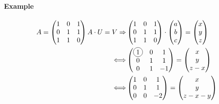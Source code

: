 \documentclass[notitlepage]{math}
\begin{document}
\paragraph{Example}
\begin{align*}
        A = \begin{pmatrix}
        1 & 0 & 1 \\
        0 & 1 & 1 \\
        1 & 1 & 0 
        \end{pmatrix} 
        A \cdot U = V \Rightarrow& 
        \begin{pmatrix}
            1 & 0 & 1 \\
            0 & 1 & 1 \\
            1 & 1 & 0
        \end{pmatrix} \cdot \begin{pmatrix}
            a \\
            b \\
            c
        \end{pmatrix} = \begin{pmatrix}
            x \\
            y \\
            z
        \end{pmatrix} \\
        \Longleftrightarrow & 
        \begin{pmatrix}
            \circled{1} & 0 & 1 \\
            0 & 1 & 1 \\
            0 & 1 & -1
        \end{pmatrix}
        =
        \begin{pmatrix}
            x \\
            y \\
            z - x
        \end{pmatrix} \\
        \Longleftrightarrow &
        \begin{pmatrix}
            1 & 0 & 1 \\
            0 & 1 & 1 \\
            0 & 0  & -2
        \end{pmatrix} = 
        \begin{pmatrix}
            x \\
            y \\
            z - x - y
        \end{pmatrix} \\

\end{align*}
\end{document}
